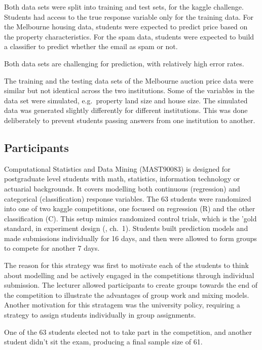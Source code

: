 \documentclass[12pt]{article}
\begin{document}
Both data sets were split into training and test sets, for the kaggle
challenge. Students had access to the true response variable only for
the training data. For the Melbourne housing data, students were
expected to predict price based on the property characteristics. For the
spam data, students were expected to build a classifier to predict
whether the email as spam or not.

Both data sets are challenging for prediction, with relatively high
error rates.

The training and the testing data sets of the Melbourne auction price
data were similar but not identical across the two institutions. Some of
the variables in the data set were simulated, e.g.~property land size
and house size. The simulated data was generated slightly differently
for different institutions. This was done deliberately to prevent
students passing answers from one institution to another.

\subsection{Participants}\label{participants}

Computational Statistics and Data Mining (MAST90083) is designed for
postgraduate level students with math, statistics, information
technology or actuarial backgrounds. It covers modelling both continuous
(regression) and categorical (classification) response variables. The 63
students were randomized into one of two kaggle competitions, one
focused on regression (R) and the other classification (C). This setup
mimics randomized control trials, which is the 'gold standard, in
experiment design (\citet{Shelley09CH1}, ch.~1). Students built
prediction models and made submissions individually for 16 days, and
then were allowed to form groups to compete for another 7 days.

The reason for this strategy was first to motivate each of the students
to think about modelling and be actively engaged in the competitions
through individual submission. The lecturer allowed participants to
create groups towards the end of the competition to illustrate the
advantages of group work and mixing models. Another motivation for this
stratagem was the university policy, requiring a strategy to assign
students individually in group assignments.

One of the 63 students elected not to take part in the competition, and
another student didn't sit the exam, producing a final sample size of
61.
\end{document}
